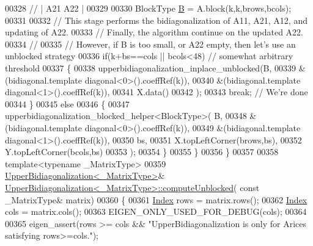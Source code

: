 \begin{DoxyCode}
00328     \textcolor{comment}{//      | A21 A22 |}
00329 
00330     BlockType \hyperlink{group___core___module_class_eigen_1_1_matrix}{B} = A.block(k,k,brows,bcols);
00331     
00332     \textcolor{comment}{// This stage performs the bidiagonalization of A11, A21, A12, and updating of A22.}
00333     \textcolor{comment}{// Finally, the algorithm continue on the updated A22.}
00334     \textcolor{comment}{//}
00335     \textcolor{comment}{// However, if B is too small, or A22 empty, then let's use an unblocked strategy}
00336     \textcolor{keywordflow}{if}(k+bs==cols || bcols<48) \textcolor{comment}{// somewhat arbitrary threshold}
00337     \{
00338       upperbidiagonalization\_inplace\_unblocked(B,
00339                                                &(bidiagonal.template diagonal<0>().coeffRef(k)),
00340                                                &(bidiagonal.template diagonal<1>().coeffRef(k)),
00341                                                X.data()
00342                                               );
00343       \textcolor{keywordflow}{break}; \textcolor{comment}{// We're done}
00344     \}
00345     \textcolor{keywordflow}{else}
00346     \{
00347       upperbidiagonalization\_blocked\_helper<BlockType>( B,
00348                                                         &(bidiagonal.template diagonal<0>().coeffRef(k)),
00349                                                         &(bidiagonal.template diagonal<1>().coeffRef(k)),
00350                                                         bs,
00351                                                         X.topLeftCorner(brows,bs),
00352                                                         Y.topLeftCorner(bcols,bs)
00353                                                       );
00354     \}
00355   \}
00356 \}
00357 
00358 \textcolor{keyword}{template}<\textcolor{keyword}{typename} \_MatrixType>
00359 \hyperlink{class_eigen_1_1internal_1_1_upper_bidiagonalization}{UpperBidiagonalization<\_MatrixType>}& 
      \hyperlink{class_eigen_1_1internal_1_1_upper_bidiagonalization}{UpperBidiagonalization<\_MatrixType>::computeUnblocked}(\textcolor{keyword}{
      const} \_MatrixType& matrix)
00360 \{
00361   \hyperlink{class_eigen_1_1internal_1_1_upper_bidiagonalization_adcb14f3919a3dcc9977ba6b8105087fe}{Index} rows = matrix.rows();
00362   \hyperlink{class_eigen_1_1internal_1_1_upper_bidiagonalization_adcb14f3919a3dcc9977ba6b8105087fe}{Index} cols = matrix.cols();
00363   EIGEN\_ONLY\_USED\_FOR\_DEBUG(cols);
00364 
00365   eigen\_assert(rows >= cols && \textcolor{stringliteral}{"UpperBidiagonalization is only for Arices satisfying rows>=cols."});

\end{DoxyCode}
